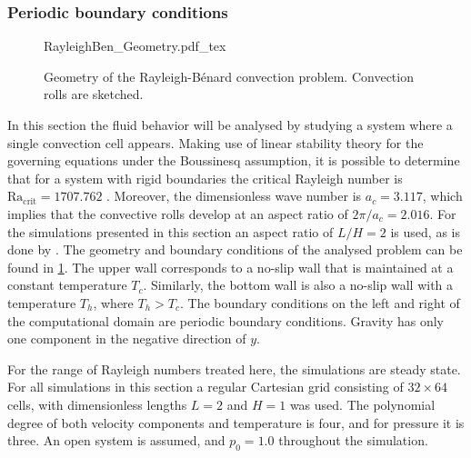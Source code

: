 \subsubsection{Periodic boundary conditions}\label{ssec:SingleCellConv}
\begin{figure}[bt]
	\begin{center}
		\def\svgwidth{0.83\textwidth}
		{RayleighBen_Geometry.pdf_tex}
		\caption{Geometry of the Rayleigh-Bénard convection problem. Convection rolls are sketched.}
		\label{fig:RayBenGeometryPeriodic}
	\end{center}
\end{figure}
In this section the fluid behavior will be analysed by studying a system where a single convection cell appears. Making use of  linear stability theory for the governing equations under the Boussinesq assumption, it is possible to determine that for a system with rigid boundaries the critical Rayleigh number is $\text{Ra}_{\text{crit}} = 1707.762$ \parencite{chandrasekharHydrodynamicHydromagneticStability1961}.  Moreover, the dimensionless wave number is $a_c =3.117$, which implies that the convective rolls develop at an aspect ratio of $2 \pi/a_c = 2.016$. For the simulations presented in this section an aspect ratio of $L/H = 2$ is used, as is done by \textcite{kaoSimulatingOscillatoryFlows2007}. The geometry and boundary conditions of the analysed problem can be found in \cref{fig:RayBenGeometryPeriodic}. The upper wall corresponds to a no-slip wall that is maintained at a constant temperature $T_c$. Similarly, the bottom wall is also a no-slip wall with a temperature $T_h$, where $T_h > T_c$. The boundary conditions on the left and right of the computational domain are periodic boundary conditions. Gravity has only one component in the negative direction of $y$. %

For the range of Rayleigh numbers treated here, the simulations are steady state. For all simulations in this section a regular Cartesian grid consisting of $32\times64$ cells, with dimensionless lengths $L = 2$ and $H = 1$ was used. The polynomial degree of both velocity components and temperature is four, and for pressure it is three. An open system is assumed, and $p_0 = 1.0$ throughout the simulation.


